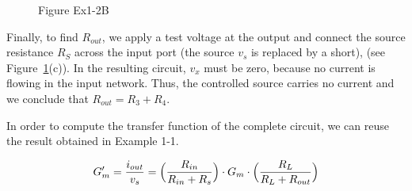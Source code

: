 \documentclass[
  11pt,
  letterpaper,
  abstract]{scrbook}
\begin{document}
\begin{figure}


\caption{\label{fig-ex-1.2b}Figure Ex1-2B}

\end{figure}%

Finally, to find \(R_{out}\), we apply a test voltage at the output and
connect the source resistance \(R_S\) across the input port (the source
\(v_s\) is replaced by a short), (see Figure~\ref{fig-ex-1.2b}(c)). In
the resulting circuit, \(v_x\) must be zero, because no current is
flowing in the input network. Thus, the controlled source carries no
current and we conclude that \(R_{out} = R_3 + R_4\).

In order to compute the transfer function of the complete circuit, we
can reuse the result obtained in Example 1-1.

\[
G'_m = \frac{i_{out}}{v_s} = \Bigl(\frac{R_{in}}{R_{in} + R_s}\Bigr) \cdot G_m \cdot \Bigl(\frac{R_{L}}{R_{L} + R_{out}}\Bigr)
\]
\end{document}
